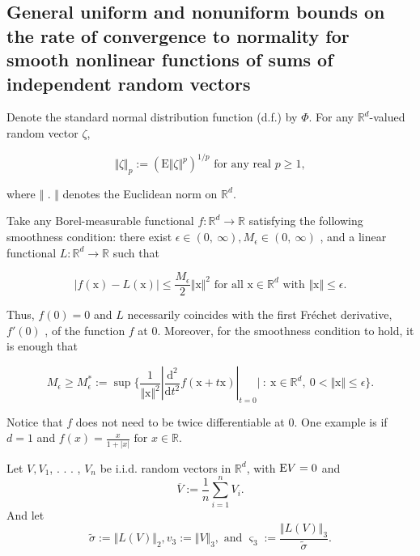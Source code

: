 \medskip

\subsection{General uniform and nonuniform bounds on the rate of convergence to normality for smooth nonlinear functions of sums of independent random vectors}

Denote the standard normal distribution function (d.f.) by $\Phi$. For any $\mathbb{R}^{d}$-valued random vector $\zeta$,

\[
\Vert\zeta\Vert_{p} :=(\mathrm{E}\Vert\zeta\Vert^{p})^{1/p} \textrm{ for any real } p\geq 1,
\]

where $\Vert$ . $\Vert$ denotes the Euclidean norm on $\mathbb{R}^{d}.$

Take any Borel-measurable functional $f:\mathbb{R}^{d}\rightarrow \mathbb{R}$ satisfying the following smoothness condition: there exist $\epsilon\in(0,\ \infty), M_{\epsilon}\in(0,\ \infty)$ , and a linear functional $L:\mathbb{R}^{d}\rightarrow \mathbb{R}$ such that

\begin{theorem}
	\begin{equation}\label{eqn:smoothness}
		|f(\displaystyle \mathrm{x})-L(\mathrm{x})|\leq\frac{M_{\epsilon}}{2}\Vert \mathrm{x}\Vert^{2} \textrm{ for all } \mathrm{x}\in \mathbb{R}^{d} \textrm{ with } \Vert \mathrm{x}\Vert\leq\epsilon .
	\end{equation}
	
\end{theorem}

Thus, $f(0)=0$ and $L$ necessarily coincides with the first Fr\'{e}chet derivative, $f'(0)$ , of the function $f$ at $0$. Moreover, for the smoothness condition to hold, it is enough that 

\[
M_{\epsilon}\geq M_{\epsilon}^{*} :=\displaystyle \sup\{\frac{1}{\Vert \mathrm{x}\Vert^{2}}|\frac{\mathrm{d}^{2}}{\mathrm{d}t^{2}}f(\mathrm{x}+t\mathrm{x})|_{t=0}|\ :\ \mathrm{x}\in \mathbb{R}^{d},\ 0<\Vert \mathrm{x}\Vert\leq\epsilon\}.
\]

Notice that $f$ does not need to be twice differentiable at $0$. One example is if $d=1$ and $f(x)= \displaystyle \frac{x}{1+|x|} \textrm{ for } x\in \mathbb{R}.$


Let $V, V_{1}$, . . . , $V_{n}$ be i.i.d. random vectors in $\mathbb{R}^{d}$, with $\mathrm{E} V=0$ and
$$
\overline{V}:=\frac{1}{n}\sum_{i=1}^{n}V_{i}.
$$
And let
\begin{equation}\label{sigmatilde}
	\tilde{\sigma} :=\Vert L(V)\Vert_{2}, v_{3} :=\Vert V\Vert_{3}, \textrm{ and } \varsigma_{3} :=\displaystyle \frac{\Vert L(V)\Vert_{3}}{\tilde{\sigma}}.
\end{equation}

